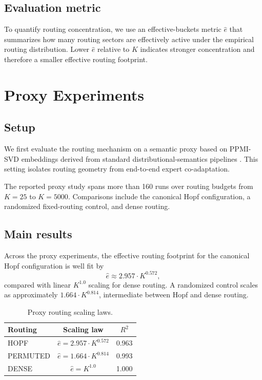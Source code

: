\documentclass[10pt,twocolumn]{article}
\begin{document}
\subsection{Evaluation metric}
To quantify routing concentration, we use an effective-buckets metric $\hat e$ that summarizes how many routing sectors are effectively active under the empirical routing distribution. Lower $\hat e$ relative to $K$ indicates stronger concentration and therefore a smaller effective routing footprint.

\section{Proxy Experiments}
\subsection{Setup}
We first evaluate the routing mechanism on a semantic proxy based on PPMI-SVD embeddings derived from standard distributional-semantics pipelines \citep{mikolov2013word2vec,pennington2014glove}. This setting isolates routing geometry from end-to-end expert co-adaptation.

The reported proxy study spans more than 160 runs over routing budgets from $K=25$ to $K=5000$. Comparisons include the canonical Hopf configuration, a randomized fixed-routing control, and dense routing.

\subsection{Main results}
Across the proxy experiments, the effective routing footprint for the canonical Hopf configuration is well fit by
\[
\hat e \approx 2.957 \cdot K^{0.572},
\]
compared with linear $K^{1.0}$ scaling for dense routing. A randomized control scales as approximately $1.664\cdot K^{0.814}$, intermediate between Hopf and dense routing.

\begin{table}[t]
\centering
\caption{Proxy routing scaling laws.}
\label{tab:scaling}
\small
\begin{tabular}{lcc}
\toprule
Routing & Scaling law & $R^2$ \\
\midrule
HOPF & $\hat e = 2.957 \cdot K^{0.572}$ & 0.963 \\
PERMUTED & $\hat e = 1.664 \cdot K^{0.814}$ & 0.993 \\
DENSE & $\hat e = K^{1.0}$ & 1.000 \\
\bottomrule
\end{tabular}
\end{table}
\end{document}
